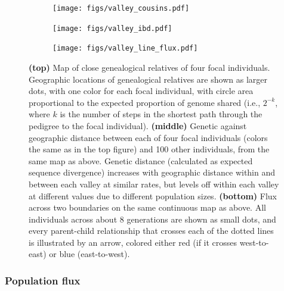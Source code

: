 \documentclass{ar-1col}
\newcommand{\plr}[1]{{\color{green}{#1}}}
\begin{document}
\begin{figure}[H]
    \centering
    \begin{subfigure}{0.49\linewidth}
        \centering
        \texttt{[image: figs/valley\_cousins.pdf]}
        \label{cousin_map}
    \end{subfigure}
    \begin{subfigure}{0.49\linewidth}
        \centering
        \texttt{[image: figs/valley\_ibd.pdf]}
        \label{ibd}
    \end{subfigure}
    \begin{subfigure}{\textwidth}
        \centering
        \texttt{[image: figs/valley\_line\_flux.pdf]}
        \label{valleyflux}
    \end{subfigure}
        \caption{
            \textbf{(top)} Map of close genealogical relatives of four focal individuals.
            Geographic locations of 
            genealogical relatives are shown as larger dots, with one color for each focal individual,
            with circle area proportional to the expected proportion of genome shared
            (i.e., $2^{-k}$, where $k$ is the number of steps in the shortest path through the pedigree to the focal individual).
            \textbf{(middle)}
            Genetic against geographic distance between each of four focal individuals
            (colors the same as in the top figure)
            and 100 other individuals, from the same map as above.
            Genetic distance (calculated as expected sequence divergence)
            increases with geographic distance within and between each valley at similar rates,
            but levels off within each valley at different values
            due to different population sizes.
            \textbf{(bottom)}
            Flux across two boundaries on the same continuous map as above.
            All individuals across about 8 generations are shown as small dots,
            and every parent-child relationship that crosses each of the dotted lines
            is illustrated by an arrow, colored either red (if it crosses west-to-east) or blue (east-to-west).
        }
        \label{fig:dispersal}
\end{figure}

\subsubsection{Population flux}

\plr{I'm tempted to call this ``dispersal flux'' instead of ``population flux''?}
\end{document}
